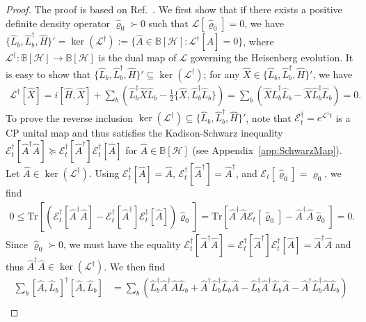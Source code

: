 \documentclass[preprint,pteplogo]{ptephy_v2}%
\numberwithin{equation}{section}
\theoremstyle{definition}
\newcommand{\mc}[1]{\mathcal{#1}}
\newcommand{\mr}[1]{\mathrm{#1}}
\newcommand{\mbb}[1]{\mathbb{#1}}
\newcommand{\Tr}{\mr{Tr}}
\begin{document}
\begin{proof}
The proof is based on Ref.~\cite{wolf2012quantum}. 
We first show that if there exists a positive definite density operator $\hat{\varrho}_0 \succ 0$ such that $\mc{L}[\hat{\varrho}_0]=0$, we have $\{ \hat{L}_b, \hat{L}_b^\dagger, \hat{H} \}' = \ker(\mc{L}^\dagger) := \{ \hat{A} \in \mbb{B}[\mc{H}] : \mc{L}^\dagger[\hat{A}] = 0 \}$, where $\mc{L}^\dagger: \mbb{B}[\mc{H}] \to \mbb{B}[\mc{H}]$ is the dual map of $\mc{L}$ governing the Heisenberg evolution.
It is easy to show that $\{ \hat{L}_b, \hat{L}_b^\dagger, \hat{H} \}' \subseteq \ker(\mc{L}^\dagger)$; for any $\hat{X} \in \{ \hat{L}_b, \hat{L}_b^\dagger, \hat{H} \}'$, we have 
\begin{align}
\mc{L}^\dagger[\hat{X}] = i[\hat{H}, \hat{X}] + \sum_b \left( \hat{L}_b^\dagger \hat{X} \hat{L}_b -\frac{1}{2} \{ \hat{X}, \hat{L}_b^\dagger \hat{L}_b \} \right) = \sum_b \left( \hat{X} \hat{L}_b^\dagger \hat{L}_b -\hat{X} \hat{L}_b^\dagger \hat{L}_b \right) = 0.
\end{align}
To prove the reverse inclusion $\ker(\mc{L}^\dagger) \subseteq \{ \hat{L}_b, \hat{L}_b^\dagger, \hat{H} \}'$, note that $\mc{E}_t^\dagger = e^{\mc{L}^\dagger t}$ is a CP unital map and thus satisfies the Kadison-Schwarz inequality $\mc{E}_t^\dagger[\hat{A}^\dagger \hat{A}] \succeq \mc{E}_t^\dagger[\hat{A}^\dagger] \mc{E}_t^\dagger[\hat{A}]$ for $\hat{A} \in \mbb{B}[\mc{H}]$ (see Appendix~\ref{app:SchwarzMap}).
Let $\hat{A} \in \ker(\mc{L}^\dagger)$. 
Using $\mc{E}_t^\dagger[\hat{A}] = \hat{A}$, $\mc{E}_t^\dagger[\hat{A}^\dagger] = \hat{A}^\dagger$, and $\mc{E}_t[\hat{\varrho}_0] = \hat{\varrho}_0$, we find
\begin{align}
0 \leq \Tr[(\mc{E}_t^\dagger[\hat{A}^\dagger \hat{A}] - \mc{E}_t^\dagger[\hat{A}^\dagger] \mc{E}_t^\dagger[\hat{A}]) \hat{\varrho}_0] = \Tr[\hat{A}^\dagger \hat{A} \mc{E}_t[\hat{\varrho}_0] - \hat{A}^\dagger \hat{A} \hat{\varrho}_0] = 0.
\end{align}
Since $\hat{\varrho}_0 \succ 0$, we must have the equality $\mc{E}_t^\dagger[\hat{A}^\dagger \hat{A}] = \mc{E}_t^\dagger[\hat{A}^\dagger] \mc{E}_t^\dagger[\hat{A}] = \hat{A}^\dagger \hat{A}$ and thus $\hat{A}^\dagger \hat{A} \in \ker(\mc{L}^\dagger)$.
We then find
\begin{align}
\sum_b [\hat{A}, \hat{L}_b]^\dagger [\hat{A}, \hat{L}_b] 
&= \sum_b \left( \hat{L}_b^\dagger \hat{A}^\dagger \hat{A} \hat{L}_b +\hat{A}^\dagger \hat{L}_b^\dagger \hat{L}_b \hat{A} - \hat{L}_b^\dagger \hat{A}^\dagger \hat{L}_b \hat{A} - \hat{A}^\dagger \hat{L}_b^\dagger \hat{A} \hat{L}_b \right) \nonumber \\

\end{align}
\end{proof}
\end{document}

